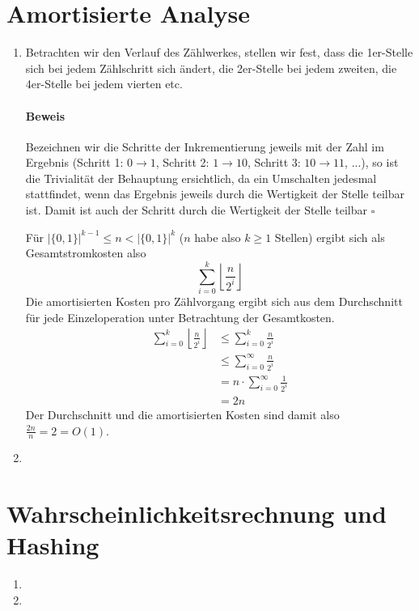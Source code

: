 \documentclass[a4paper,10pt]{article}
\begin{document}
\section{Amortisierte Analyse}
\begin{enumerate}
\item   Betrachten wir den Verlauf des Zählwerkes, stellen wir fest, dass die 1er-Stelle sich bei jedem Zählschritt sich 
        ändert, die 2er-Stelle bei jedem zweiten, die 4er-Stelle bei jedem vierten etc. 
        \paragraph*{Beweis} Bezeichnen wir die Schritte der Inkrementierung jeweils mit der Zahl im Ergebnis (Schritt 1: $0 \to 1$, Schritt 2: $1 \to 10$, Schritt 3: $10 \to 11$, ...), so ist die Trivialität der Behauptung ersichtlich, da ein Umschalten jedesmal stattfindet, wenn das Ergebnis jeweils durch die Wertigkeit der Stelle teilbar ist. Damit ist auch der Schritt durch die Wertigkeit der Stelle teilbar \hfill $\square$
        
        Für $\left|\{0,1\}\right|^{k-1} \leq n < \left|\{0,1\}\right|^{k}$ ($n$ habe also $k \geq 1$ Stellen) ergibt sich als Gesamtstromkosten also
        \[\sum\limits_{i=0}^{k} \left\lfloor\frac{n}{2^i}\right\rfloor\]
        Die amortisierten Kosten pro Zählvorgang ergibt sich aus dem Durchschnitt für jede Einzeloperation unter Betrachtung der Gesamtkosten.
        \begin{align*}
         \sum\limits_{i=0}^{k} \left\lfloor\frac{n}{2^i}\right\rfloor &\leq \sum\limits_{i=0}^{k} \frac{n}{2^i} \\
                                                                      &\leq \sum\limits_{i=0}^{\infty} \frac{n}{2^i} \\
                                                                      &= n \cdot \sum\limits_{i=0}^{\infty} \frac{1}{2^i} \\
                                                                      &= 2n
        \end{align*}
        Der Durchschnitt und die amortisierten Kosten sind damit also $\frac{2n}{n} = 2 = O(1)$.
\item   
\end{enumerate}

\section{Wahrscheinlichkeitsrechnung und Hashing}
\begin{enumerate}
\item   
\item   
\end{enumerate}
\end{document}
